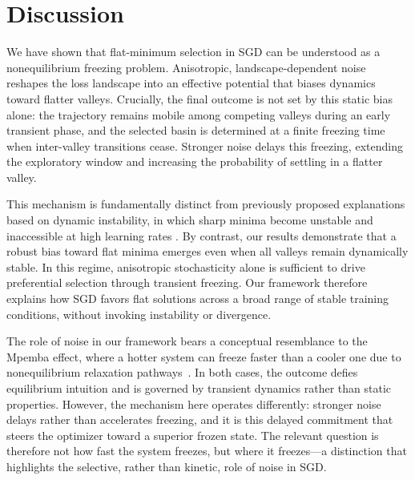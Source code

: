 \documentclass[aps,prx,reprint,superscriptaddress,longbibliography,nofootinbib,floatfix]{revtex4-2}
\begin{document}
\section{Discussion}
We have shown that flat-minimum selection in SGD can be understood as a nonequilibrium freezing problem. Anisotropic, landscape-dependent noise reshapes the loss landscape into an effective potential that biases dynamics toward flatter valleys. Crucially, the final outcome is not set by this static bias alone: the trajectory remains mobile among competing valleys during an early transient phase, and the selected basin is determined at a finite freezing time when inter-valley transitions cease. Stronger noise delays this freezing, extending the exploratory window and increasing the probability of settling in a flatter valley.

This mechanism is fundamentally distinct from previously proposed explanations based on dynamic instability, in which sharp minima become unstable and inaccessible at high learning rates \cite{wuHowSGDSelects2018}. By contrast, our results demonstrate that a robust bias toward flat minima emerges even when all valleys remain dynamically stable. In this regime, anisotropic stochasticity alone is sufficient to drive preferential selection through transient freezing. Our framework therefore explains how SGD favors flat solutions across a broad range of stable training conditions, without invoking instability or divergence.

The role of noise in our framework bears a conceptual resemblance to the Mpemba effect, where a hotter system can freeze faster than a cooler one due to nonequilibrium relaxation pathways~\cite{mpembaCool1969,auerbachSupercoolingMpembaEffect1995,brownridgeWhenDoesHot2011,luNonequilibriumThermodynamicsMarkovian2017}. In both cases, the outcome defies equilibrium intuition and is governed by transient dynamics rather than static properties. However, the mechanism here operates differently: stronger noise delays rather than accelerates freezing, and it is this delayed commitment that steers the optimizer toward a superior frozen state. The relevant question is therefore not how fast the system freezes, but where it freezes---a distinction that highlights the selective, rather than kinetic, role of noise in SGD.
\end{document}
